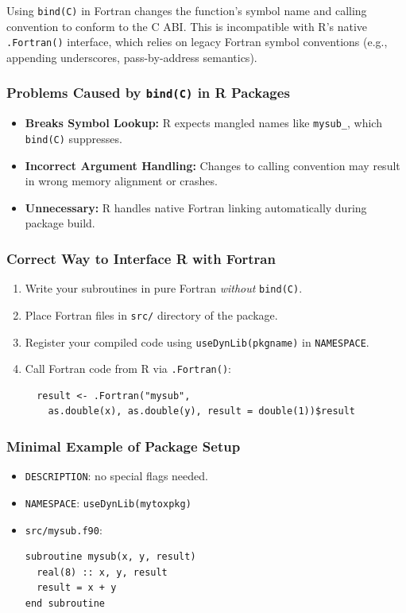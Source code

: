\documentclass{article}
\begin{document}
Using \texttt{bind(C)} in Fortran changes the function's symbol name and calling convention to conform to the C ABI. This is incompatible with R's native \texttt{.Fortran()} interface, which relies on legacy Fortran symbol conventions (e.g., appending underscores, pass-by-address semantics).

\subsubsection*{Problems Caused by \texttt{bind(C)} in R Packages}
\begin{itemize}
  \item \textbf{Breaks Symbol Lookup:} R expects mangled names like \texttt{mysub\_}, which \texttt{bind(C)} suppresses.
  \item \textbf{Incorrect Argument Handling:} Changes to calling convention may result in wrong memory alignment or crashes.
  \item \textbf{Unnecessary:} R handles native Fortran linking automatically during package build.
\end{itemize}

\subsubsection*{Correct Way to Interface R with Fortran}
\begin{enumerate}
  \item Write your subroutines in pure Fortran \emph{without} \texttt{bind(C)}.
  \item Place Fortran files in \texttt{src/} directory of the package.
  \item Register your compiled code using \texttt{useDynLib(pkgname)} in \texttt{NAMESPACE}.
  \item Call Fortran code from R via \texttt{.Fortran()}:
\begin{verbatim}
  result <- .Fortran("mysub",
    as.double(x), as.double(y), result = double(1))$result
\end{verbatim}
\end{enumerate}

\subsubsection*{Minimal Example of Package Setup}
\begin{itemize}
  \item \texttt{DESCRIPTION}: no special flags needed.
  \item \texttt{NAMESPACE}: \verb|useDynLib(mytoxpkg)|
  \item \texttt{src/mysub.f90}:
\begin{verbatim}
subroutine mysub(x, y, result)
  real(8) :: x, y, result
  result = x + y
end subroutine
\end{verbatim}
\end{itemize}
\end{document}
